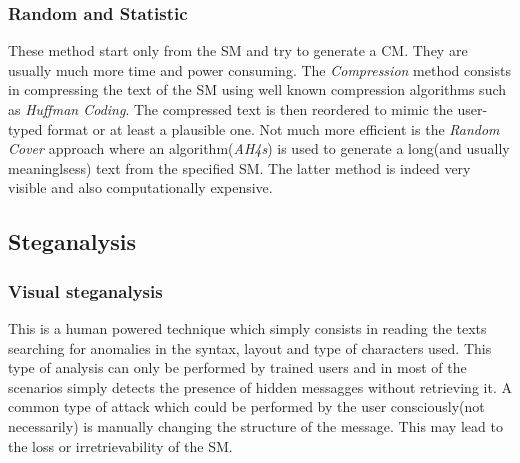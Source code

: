 \documentclass[../../main.tex]{subfiles}
\begin{document}
\subsubsection{Random and Statistic}
These method start only from the SM and try to generate a CM.
They are usually much more time and power consuming.
The \emph{Compression} method consists in compressing the text of the SM
using well known compression algorithms such as \emph{Huffman Coding}.
The compressed text is then reordered to mimic the user-typed format or
at least a plausible one.
Not much more efficient is the \emph{Random Cover} approach where an
algorithm(\emph{AH4s}) is used to generate a long(and usually meaninglsess)
text from the specified SM.
The latter method is indeed very visible and also computationally expensive.

\subsection{Steganalysis}

\subsubsection{Visual steganalysis}
This is a human powered technique which simply consists in reading the texts
searching for anomalies in the syntax, layout and type of characters
used.
This type of analysis can only be performed by trained users and in most of
the scenarios simply detects the presence of hidden messagges without
retrieving it.
A common type of attack which could be performed by the user consciously(not
necessarily) is manually changing the structure of the message.
This may lead to the loss or irretrievability of the SM.
\end{document}
